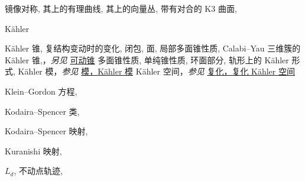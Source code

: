 \begin{theindex}
\subitem \leavevmode\hypertarget{idx:0660}{镜像对称},\enspace{}
\subitem \leavevmode\hypertarget{idx:0661}{其上的有理曲线},\enspace{}
\subitem \leavevmode\hypertarget{idx:0662}{其上的向量丛},\enspace{}
\subitem \leavevmode\hypertarget{idx:0663}{带有对合的 K3 曲面},\enspace{}
\indexspace
\item \leavevmode\hypertarget{idx:0664}{Kähler}
\subitem \leavevmode\hypertarget{idx:0665}{Kähler 锥},\enspace{}
\subsubitem \leavevmode\hypertarget{idx:0666}{复结构变动时的变化},\enspace{}
\subsubitem \leavevmode\hypertarget{idx:0667}{闭包},\enspace{}
\subsubitem \leavevmode\hypertarget{idx:0668}{面},\enspace{}
\subsubitem \leavevmode\hypertarget{idx:0669}{局部多面锥性质},\enspace{}
\subsubitem \leavevmode\hypertarget{idx:0670}{Calabi--Yau 三维簇的 Kähler 锥},\enspace{}，\textit{另见} \hyperlink{idx:0913}{可动锥}
\subsubitem \leavevmode\hypertarget{idx:0671}{多面锥性质},\enspace{}
\subsubitem \leavevmode\hypertarget{idx:0672}{单纯锥性质},\enspace{}
\subsubitem \leavevmode\hypertarget{idx:0673}{环面部分},\enspace{}
\subitem \leavevmode\hypertarget{idx:0674}{轨形上的 Kähler 形式},\enspace{}
\subitem \leavevmode\hypertarget{idx:0675}{Kähler 模}，\textit{参见} \hyperlink{idx:0882}{模，Kähler 模}
\subitem \leavevmode\hypertarget{idx:0676}{Kähler 空间}，\textit{参见} \hyperlink{idx:0143}{复化，复化 Kähler 空间}
\indexspace
\item \leavevmode\hypertarget{idx:0680}{Klein--Gordon 方程},\enspace{}
\indexspace
\item \leavevmode\hypertarget{idx:0681}{Kodaira--Spencer 类},\enspace{}
\indexspace
\item \leavevmode\hypertarget{idx:0682}{Kodaira--Spencer 映射},\enspace{}
\indexspace
\item \leavevmode\hypertarget{idx:0683}{Kuranishi 映射},\enspace{}
\indexspace
\item \leavevmode\hypertarget{source:484}{}\hypertarget{idx:0705}{$L_d$},\enspace{}
\subitem \leavevmode\hypertarget{idx:0706}{不动点轨迹},\enspace{}

\end{theindex}
